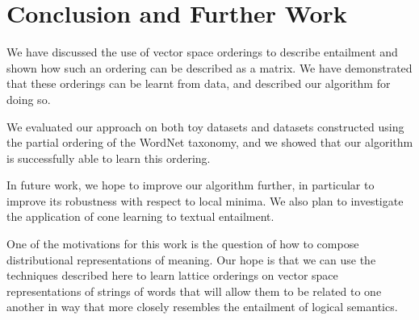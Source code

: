 
\section{Conclusion and Further Work}

We have discussed the use of vector space orderings to describe
entailment and shown how such an ordering can be described as a
matrix. We have demonstrated that these orderings can be learnt from
data, and described our algorithm for doing so.

We evaluated our approach on both toy datasets and datasets
constructed using the partial ordering of the WordNet taxonomy, and we
showed that our algorithm is successfully able to learn this ordering.

In future work, we hope to improve our algorithm further, in
particular to improve its robustness with respect to local minima. We
also plan to investigate the application of cone learning to textual
entailment.

One of the motivations for this work is the question of how to compose
distributional representations of meaning. Our hope is that we can use
the techniques described here to learn lattice orderings on vector
space representations of strings of words that will allow them to be
related to one another in way that more closely resembles the
entailment of logical semantics.
